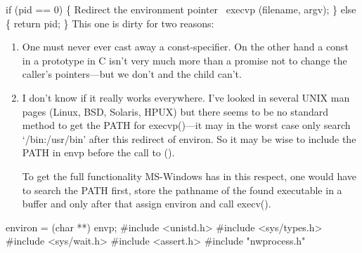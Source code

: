 \documentclass[11pt,a4paper]{article}%
\begin{document}
if (pid == 0)
\{
  \LA{}Redirect the environment pointer~{\nwtagstyle{}}\RA{}
  execvp (filename, argv);
\}
else
\{
  return pid;
\}
\nwendcode{}\nwdocspar
This one is dirty for two reasons:
\begin {enumerate}
  \item {One must never ever cast away a {\Tt{}const}-specifier. On the
    other hand a {\Tt{}const} in a prototype in C isn't very much more
    than a promise not to change the caller's pointers---but
    we don't and the child can't.}
  \item {I don't know if it really works everywhere. 
    I've looked in several UNIX man pages 
    (Linux, BSD, Solaris, HPUX) but there seems to be
    no standard method to get the {\Tt{}PATH} for {\Tt{}execvp()}---it may 
    in the worst case only search `{\Tt{}/bin:/usr/bin}' after this 
    redirect of {\Tt{}environ}. So it may be wise to include the {\Tt{}PATH}
    in {\Tt{}envp} before the call to {\Tt{}()}.
    
    To get the full functionality MS-Windows\texttrademark{} has in 
    this respect, one would have to search the {\Tt{}PATH} first, store
    the pathname of the found executable in a buffer and only after
    that assign {\Tt{}environ} and call {\Tt{}execv()}.}
\end {enumerate}
\nwenddocs{}\endmoddef\nwstartdeflinemarkup{}\nwenddeflinemarkup
environ = (char **) envp;
\nwendcode{}\endmoddef\nwstartdeflinemarkup{}\nwenddeflinemarkup
#include <unistd.h>
#include <sys/types.h>
#include <sys/wait.h>
#include <assert.h>
#include "nwprocess.h"
\nwendcode{}\nwdocspar
\end{document}

